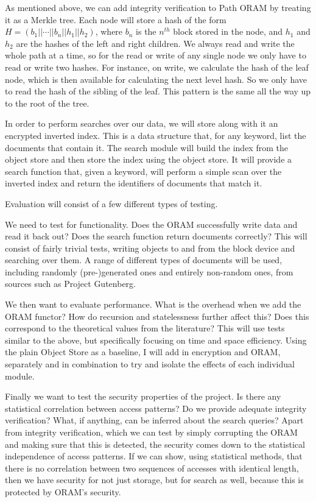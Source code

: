 \documentclass[12pt,a4paper,twoside]{article}
\begin{document}

As mentioned above, we can add integrity verification to Path ORAM by treating it as a Merkle tree. Each node will store a hash of the form $H = (b_1||\cdots||b_n||h_1||h_2)$, where $b_n$ is the $n^{th}$ block stored in the node, and $h_1$ and $h_2$ are the hashes of the left and right children. We always read and write the whole path at a time, so for the read or write of any single node we only have to read or write two hashes. For instance, on write, we calculate the hash of the leaf node, which is then available for calculating the next level hash. So we only have to read the hash of the sibling of the leaf. This pattern is the same all the way up to the root of the tree.


In order to perform searches over our data, we will store along with it an encrypted inverted index. This is a data structure that, for any keyword, list the documents that contain it. The search module will build the index from the object store and then store the index using the object store. It will provide a search function that, given a keyword, will perform a simple scan over the inverted index and return the identifiers of documents that match it.


Evaluation will consist of a few different types of testing. 

We need to test for functionality. Does the ORAM successfully write data and read it back out? Does the search function return documents correctly? This will consist of fairly trivial tests, writing objects to and from the block device and searching over them. A range of different types of documents will be used, including randomly (pre-)generated ones and entirely non-random ones, from sources such as Project Gutenberg.

We then want to evaluate performance. What is the overhead when we add the ORAM functor? How do recursion and statelessness further affect this? Does this correspond to the theoretical values from the literature? This will use tests similar to the above, but specifically focusing on time and space efficiency. Using the plain Object Store as a baseline, I will add in encryption and ORAM, separately and in combination to try and isolate the effects of each individual module. 

Finally we want to test the security properties of the project. Is there any statistical correlation between access patterns? Do we provide adequate integrity verification? What, if anything, can be inferred about the search queries? Apart from integrity verification, which we can test by simply corrupting the ORAM and making sure that this is detected, the security comes down to the statistical independence of access patterns. If we can show, using statistical methods, that there is no correlation between two sequences of accesses with identical length, then we have security for not just storage, but for search as well, because this is protected by ORAM's security.
\end{document}
